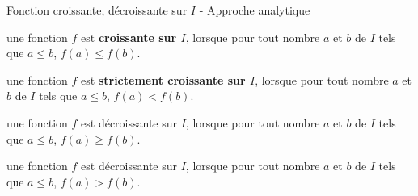  

\begin{DefT}{Fonction croissante, décroissante sur $I$  - Approche analytique }
\begin{description}[leftmargin=*]
\item[•] une fonction $f$ est \textbf{croissante sur $I$}, lorsque pour tout nombre $a$ et $b$ de $I$ tels que $a \leq b$, $f(a) \leq f(b)$.
\item[•] une fonction $f$ est \textbf{strictement croissante sur $I$}, lorsque pour tout nombre $a$ et $b$ de $I$ tels que $a \leq b$, $f(a) < f(b)$.
\item[•] une fonction $f$ est décroissante sur $I$, lorsque pour tout nombre $a$ et $b$ de $I$ tels que $a \leq b$, $f(a) \geq f(b)$.
\item[•] une fonction $f$ est décroissante sur $I$, lorsque pour tout nombre $a$ et $b$ de $I$ tels que $a \leq b$, $f(a) > f(b)$.
\end{description} 
\end{DefT}


